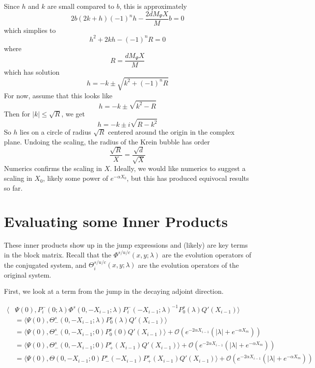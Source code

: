 \documentclass[thesis.tex]{subfiles}
\begin{document}
Since $h$ and $k$ are small compared to $b$, this is approximately
\[
2b (2 k + h)(-1)^n h - \frac{2 d M_\Psi X}{M}b = 0
\]
which simplies to
\[
h^2 + 2kh - (-1)^n R = 0
\]
where
\[
R = \frac{d M_\Psi X}{M}
\]
which has solution
\[
h = -k \pm \sqrt{k^2 + (-1)^n R}
\]
For now, assume that this looks like
\[
h = -k \pm \sqrt{k^2 - R}
\]
Then for $|k| \leq \sqrt{R}$, we get
\[
h = -k \pm i \sqrt{R - k^2}
\]
So $h$ lies on a circle of radius $\sqrt{R}$ centered around the origin in the complex plane. Undoing the scaling, the radius of the Krein bubble has order
\[
\frac{\sqrt{R}}{X} = \frac{\sqrt{d}}{\sqrt{X}}
\] 
Numerics confirms the scaling in $X$. Ideally, we would like numerics to suggest a scaling in $X_0$, likely some power of $e^{-\alpha X_0}$, but this has produced equivocal results so far.

\section{Evaluating some Inner Products}

These inner products show up in the jump expressions and (likely) are key terms in the block matrix. Recall that the $\Phi^{s/u/c}(x, y; \lambda)$ are the evolution operators of the conjugated system, and $\Theta_i^{s/u/c}(x, y; \lambda)$ are the evolution operators of the original system.

First, we look at a term from the jump in the decaying adjoint direction.

\begin{align*}
\langle &\Psi(0), P_i^-(0; \lambda) \Phi^s(0, -X_{i-1}; \lambda) P_i^-(-X_{i-1}; \lambda)^{-1} P_0^s(\lambda) Q'(X_{i-1})\rangle \\
&= \langle \Psi(0), \Theta_-^s(0, -X_{i-1}; \lambda) P_0^s(\lambda) Q'(X_{i-1})\rangle \\
&= \langle \Psi(0), \Theta_-^s(0, -X_{i-1}; 0) P_0^s(0) Q'(X_{i-1})\rangle + \mathcal{O}(e^{-2\alpha X_{i-1}}(|\lambda| + e^{-\alpha X_m})) \\
&= \langle \Psi(0), \Theta_-^s(0, -X_{i-1}; 0) P^s_+(X_{i-1}) Q'(X_{i-1})\rangle + \mathcal{O}(e^{-2\alpha X_{i-1}}(|\lambda| + e^{-\alpha X_m})) \\
&= \langle \Psi(0), \Theta(0, -X_{i-1}; 0) P^s_-(-X_{i-1}) P^s_+(X_{i-1}) Q'(X_{i-1})\rangle + \mathcal{O}(e^{-2\alpha X_{i-1}}(|\lambda| + e^{-\alpha X_m}))
\end{align*}
\end{document}
